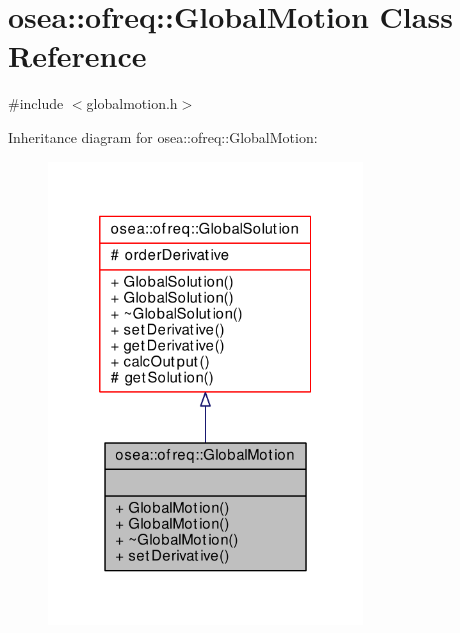 \hypertarget{classosea_1_1ofreq_1_1_global_motion}{\section{osea\-:\-:ofreq\-:\-:Global\-Motion Class Reference}
\label{classosea_1_1ofreq_1_1_global_motion}
}


{\ttfamily \#include $<$globalmotion.\-h$>$}



Inheritance diagram for osea\-:\-:ofreq\-:\-:Global\-Motion\-:\nopagebreak
\begin{figure}[H]
\begin{center}
\leavevmode
\includegraphics[width=236pt]{classosea_1_1ofreq_1_1_global_motion__inherit__graph}
\end{center}
\end{figure}
